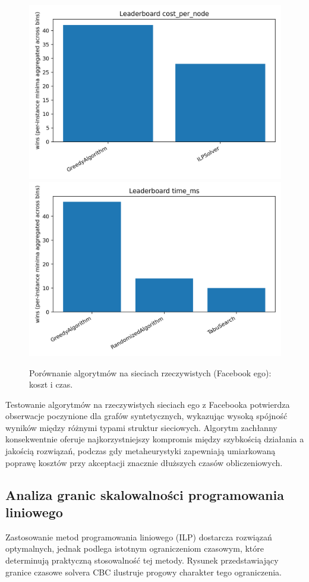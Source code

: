 \begin{figure}[H]
  \centering
  \includegraphics[width=0.48\linewidth]{assets/figures/br_leaderboard_cost.png}
  \includegraphics[width=0.48\linewidth]{assets/figures/br_leaderboard_time.png}
  \caption{Porównanie algorytmów na sieciach rzeczywistych (Facebook ego): koszt i czas.}
  \label{fig:facebook_results}
\end{figure}

Testowanie algorytmów na rzeczywistych sieciach ego z Facebooka potwierdza obserwacje poczynione dla grafów syntetycznych, wykazując wysoką spójność wyników między różnymi typami struktur sieciowych. Algorytm zachłanny konsekwentnie oferuje najkorzystniejszy kompromis między szybkością działania a jakością rozwiązań, podczas gdy metaheurystyki zapewniają umiarkowaną poprawę kosztów przy akceptacji znacznie dłuższych czasów obliczeniowych.

\subsection{Analiza granic skalowalności programowania liniowego}

Zastosowanie metod programowania liniowego (ILP) dostarcza rozwiązań optymalnych, jednak podlega istotnym ograniczeniom czasowym, które determinują praktyczną stosowalność tej metody. Rysunek przedstawiający granice czasowe solvera CBC ilustruje progowy charakter tego ograniczenia.

